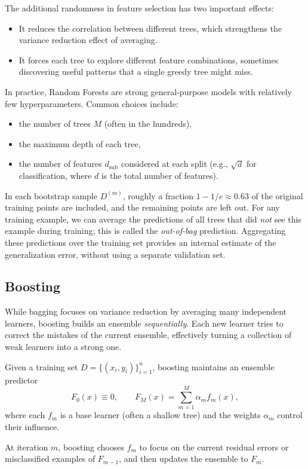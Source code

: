 \documentclass[../main]{subfiles}
\begin{document}
The additional randomness in feature selection has two important effects:
\begin{itemize}
    \item It reduces the correlation between different trees, which
    strengthens the variance reduction effect of averaging.
    \item It forces each tree to explore different feature combinations,
    sometimes discovering useful patterns that a single greedy tree might miss.
\end{itemize}

In practice, Random Forests are strong general-purpose models with relatively
few hyperparameters.  Common choices include:
\begin{itemize}
    \item the number of trees $M$ (often in the hundreds),
    \item the maximum depth of each tree,
    \item the number of features $d_{\mathrm{sub}}$ considered at each split
    (e.g., $\sqrt{d}$ for classification, where $d$ is the total number of
    features).
\end{itemize}

\begin{remark}
    In each bootstrap sample $D^{(m)}$, roughly a fraction $1-1/e\approx 0.63$
    of the original training points are included, and the remaining points are
    left out.  For any training example, we can average the predictions of all
    trees that did \emph{not} see this example during training; this is called
    the \emph{out-of-bag} prediction.  Aggregating these predictions over the
    training set provides an internal estimate of the generalization error,
    without using a separate validation set.
\end{remark}

\subsection{Boosting}

While bagging focuses on variance reduction by averaging many independent
learners, boosting builds an ensemble \emph{sequentially}.  Each new learner
tries to correct the mistakes of the current ensemble, effectively turning a
collection of weak learners into a strong one.

\begin{definition}[Boosting]
    Given a training set $D = \{(x_i,y_i)\}_{i=1}^n$, boosting maintains an
    ensemble predictor
    \begin{equation}
        F_0(x) \equiv 0,\qquad
        F_M(x) = \sum_{m=1}^M \alpha_m f_m(x),
    \end{equation}
    where each $f_m$ is a base learner (often a shallow tree) and the weights
    $\alpha_m$ control their influence.
    
    At iteration $m$, boosting chooses $f_m$ to focus on the current residual
    errors or misclassified examples of $F_{m-1}$, and then updates the ensemble
    to $F_m$.
\end{definition}
\end{document}
